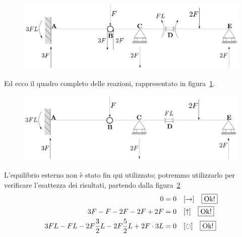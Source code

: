 \renewcommand{\thefigure}{8.1~-~5}
\begin{figure}[ht]
\centering
\includegraphics[width=\textwidth]{Immagini/Parte_8/Esercizio8_1/Esercizio8_1_2.pdf}
\caption{}
\label{Esercizio8-1-5}
\end{figure}
Ed ecco il quadro completo delle reazioni, rappresentato in figura~\ref{Esercizio8-1-5}. 
\renewcommand{\thefigure}{8.1~-~6}
\begin{figure}[ht]
\centering
\includegraphics[width=\textwidth]{Immagini/Parte_8/Esercizio8_1/Esercizio8_1_3.pdf}
\caption{}
\label{Esercizio8-1-6}
\end{figure}
L'equilibrio esterno non è stato fin qui utilizzato; potremmo utilizzarlo per verificare l'esattezza dei risultati, partendo dalla figura~\ref{Esercizio8-1-6}
\begin{align*}
0 &= 0 \quad [\to] \quad \boxed{\textup{Ok!}} \\ 
3F-F-2F-2F+2F &= 0 \quad [\uparrow]  \quad \boxed{\textup{Ok!}} \\
3FL-FL-2F\frac{3}{2}L-2F\frac{5}{2}L+2F\cdot 3L &=0 \quad [\circlearrowright] \quad \boxed{\textup{Ok!}}
\end{align*}
\clearpage

